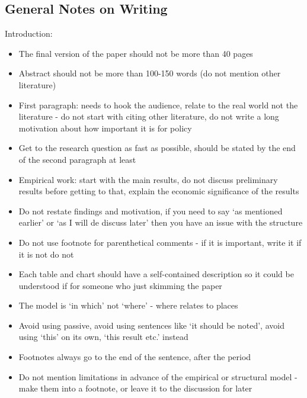 \documentclass[12pt]{article}
\begin{document}
\subsection*{General Notes on Writing} 
Introduction:
\begin{itemize} \setlength\itemsep{0em}  \small
    \item The final version of the paper should not be more than 40 pages
    \item Abstract should not be more than 100-150 words (do not mention other literature)
    \item First paragraph: needs to hook the audience, relate to the real world not the literature  - do not start with citing other literature, do not write a long motivation about how important it is for policy
    \item Get to the research question as fast as possible, should be stated by the end of the second paragraph at least
    \item Empirical work: start with the main results, do not discuss preliminary results before getting to that, explain the economic significance of the results
    \item Do not restate findings and motivation, if you need to say `as mentioned earlier' or `as I will de discuss later' then you have an issue with the structure
    \item Do not use footnote for parenthetical comments - if it is important, write it if it is not do not
    \item Each table and chart should have a self-contained description so it could be understood if for someone who just skimming the paper
    \item The model is `in which' not `where' - where relates to places
    \item Avoid using passive, avoid using sentences like `it should be noted', avoid using `this' on its own, `this result etc.' instead
    \item Footnotes always go to the end of the sentence, after the period
    \item Do not mention limitations in advance of the empirical or structural model - make them into a footnote, or leave it to the discussion for later
\end{itemize} \normalsize
\end{document}
